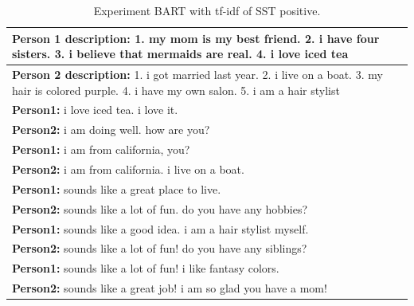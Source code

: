 \begin{table}[ht]
\centering
 \begin{tabular}{|p{14cm}|} 
 \hline\hline
 \textbf{Person 1 description:} 1. my mom is my best friend. 2. i have four sisters. 3. i believe that mermaids are real. 4. i love iced tea \\
 \hline
 \textbf{Person 2 description:} 1. i got married last year. 2. i live on a boat. 3. my hair is colored purple. 4. i have my own salon. 5. i am a hair stylist \\
 \hline\hline
 \textbf{Person1:} i love iced tea. i love it. \\
 \textbf{Person2:} i am doing well. how are you? \\ 
 \textbf{Person1:} i am from california, you? \\
 \textbf{Person2:} i am from california. i live on a boat.\\
 \textbf{Person1:} sounds like a great place to live. \\
 \textbf{Person2:} sounds like a lot of fun. do you have any hobbies? \\
 \textbf{Person1:} sounds like a good idea. i am a hair stylist myself. \\
 \textbf{Person2:} sounds like a lot of fun! do you have any siblings? \\
 \textbf{Person1:} sounds like a lot of fun! i like fantasy colors. \\
 \textbf{Person2:} sounds like a great job! i am so glad you have a mom! \\
 \hline\hline
 \end{tabular}
 \caption{Experiment BART with tf-idf of SST positive.}
\label{tab:bart_tfidf_sst_pos}
\end{table}

